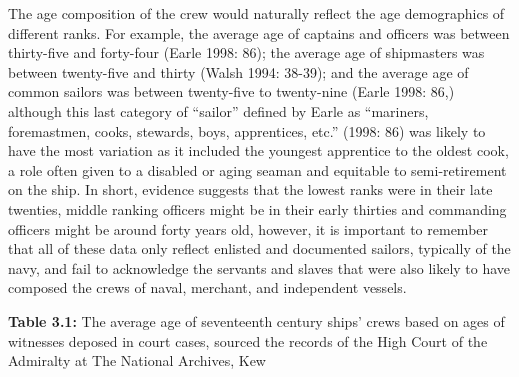 \begin{styleStandard}
The age composition of the crew would naturally reflect the age demographics of different ranks. For example, the average age of captains and officers was between thirty-five and forty-four (Earle 1998: 86); the average age of shipmasters was between twenty-five and thirty (Walsh 1994: 38-39); and the average age of common sailors was between twenty-five to twenty-nine (Earle 1998: 86,) although this last category of “sailor” defined by Earle as “mariners, foremastmen, cooks, stewards, boys, apprentices, etc.” (1998: 86) was likely to have the most variation as it included the youngest apprentice to the oldest cook, a role often given to a disabled or aging seaman and equitable to semi-retirement on the ship. In short, evidence suggests that the lowest ranks were in their late twenties, middle ranking officers might be in their early thirties and commanding officers might be around forty years old, however, it is important to remember that all of these data only reflect enlisted and documented sailors, typically of the navy, and fail to acknowledge the servants and slaves that were also likely to have composed the crews of naval, merchant, and independent vessels. 
\end{styleStandard}

\begin{styleStandard}
\textbf{Table 3.1:} The average age of seventeenth century ships’ crews based on ages of witnesses deposed in court cases, sourced the records of the High Court of the Admiralty at The National Archives, Kew 
\end{styleStandard}

